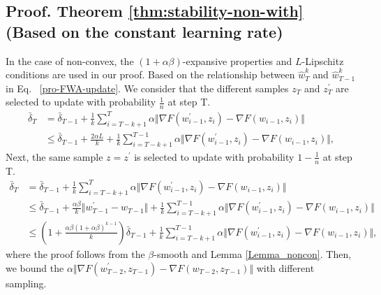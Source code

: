 \subsection{\textbf{Proof. Theorem \ref{thm:stability-non-with} (Based on the constant learning rate)}}
\label{proof-thm-non-with} In the case of non-convex, the $(1+\alpha\beta)$-expansive properties and $L$-Lipschitz conditions are used in our proof. Based on the relationship between $\hat{w}^{k}_T$ and $\hat{w}^{k}_{T-1}$ in Eq. ~\eqref{pro-FWA-update}. We consider that the different samples $z_T$ and $z^{\prime}_T$ are selected to update with probability $\frac{1}{n}$ at step T.
\begin{equation}
  \begin{aligned}
   \bar{\delta}_{T} &= \bar{\delta}_{T-1} + \frac{1}{k}\sum_{i=T-k+1}^{T} \alpha \Vert\nabla F(w^{\prime}_{i-1},z_i) - \nabla F(w_{i-1},z_i) \Vert \\
   &\leq \bar{\delta}_{T-1} + \frac{2\alpha L}{k} + \frac{1}{k}\sum_{i=T-k+1}^{T-1} \alpha \Vert\nabla F(w^{\prime}_{i-1},z_i) - \nabla F(w_{i-1},z_i) \Vert ,
  \end{aligned}
 \end{equation}
Next, the same sample $z=z^{\prime}$ is selected to update with probability $1-\frac{1}{n}$ at step T.
\begin{equation}
  \begin{aligned}
   \bar{\delta}_{T} &= \bar{\delta}_{T-1} + \frac{1}{k}\sum_{i=T-k+1}^{T} \alpha \Vert\nabla F(w^{\prime}_{i-1},z_i) - \nabla F(w_{i-1},z_i) \Vert \\
   &\leq \bar{\delta}_{T-1} + \frac{\alpha \beta}{k}\Vert w^{\prime}_{T-1} - w_{T-1} \Vert + \frac{1}{k}\sum_{i=T-k+1}^{T-1} \alpha \Vert\nabla F(w^{\prime}_{i-1},z_i) - \nabla F(w_{i-1},z_i) \Vert \\
   &\leq (1+\frac{\alpha \beta(1+\alpha \beta)^{k-1}}{k})\bar{\delta}_{T-1} + \frac{1}{k}\sum_{i=T-k+1}^{T-1} \alpha \Vert\nabla F(w^{\prime}_{i-1},z_i) - \nabla F(w_{i-1},z_i) \Vert,
  \end{aligned}
 \end{equation}
where the proof follows from the $\beta$-smooth and Lemma \ref{Lemma_noncon}. Then, we bound the $\alpha \Vert\nabla F(w^{\prime}_{T-2},z_{T-1}) - \nabla F(w_{T-2},z_{T-1}) \Vert$ with different sampling. 
